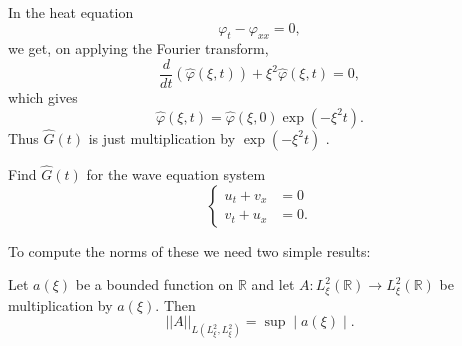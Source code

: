 \begin{exam}\label{chap6:exam6.2}
In the heat equation
\begin{equation*}
\varphi_t - \varphi_{xx} = 0,\tag{6.10}\label{eq6.10}
\end{equation*}
we get, on applying the Fourier transform,
\begin{equation*}
\frac{d}{dt} (\hat{\varphi} (\xi, t)) + \xi^2 \hat{\varphi} (\xi ,t) =
0, \tag{6.11}\label{eq6.11}
\end{equation*}
which gives 
\begin{equation*}
\hat{\varphi} (\xi, t) = \hat{\varphi} (\xi, 0) \exp (-\xi^2 t). 
\tag{6.12}\label{eq6.12}
\end{equation*}
Thus $\hat{G}(t)$ is just multiplication by $\exp (-\xi^2 t)$ . 
\end{exam}

\begin{exercise}\label{chap6:exer6.1}
Find $\hat{G}(t)$ for the wave equation system
$$
\begin{cases}
u_t + v_x & = 0\\
v_t + u_x & = 0.
\end{cases}
$$
\end{exercise}

To compute the norms of these we need two simple results:

\begin{lem}\label{chap6:lem6.1}
Let $a(\xi)$ be a bounded function on $\mathbb{R}$ and let $A: L^2_\xi
(\mathbb{R}) \to L^2_\xi (\mathbb{R})$ be multiplication by
$a(\xi)$. Then
\begin{equation*}
||A||_{L(L^2_\xi, L^2_\xi )} = \sup \mid a (\xi)\mid.
\tag{6.13}\label{eq6.13}
\end{equation*}
\end{lem}

